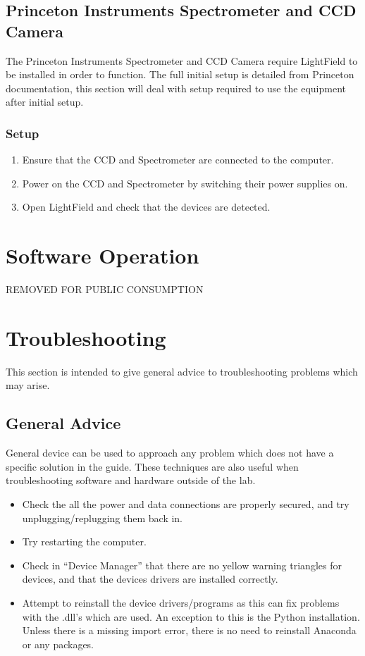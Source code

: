 \documentclass[11pt, letterpaper, titlepage]{article}
\begin{document}
\subsection{Princeton Instruments Spectrometer and CCD Camera} %
The Princeton Instruments Spectrometer and CCD Camera require LightField to be installed in order to function.
The full initial setup is detailed from Princeton documentation, this section will deal with setup required to use the equipment after initial setup.
\subsubsection{Setup} %
\begin{enumerate}
    \item Ensure that the CCD and Spectrometer are connected to the computer.
    \item Power on the CCD and Spectrometer by switching their power supplies on.
    \item Open LightField and check that the devices are detected.
\end{enumerate}
\newpage
\section{Software Operation} %
REMOVED FOR PUBLIC CONSUMPTION
\newpage
\section{Troubleshooting} %
This section is intended to give general advice to troubleshooting problems which may arise.
\subsection{General Advice} %
General device can be used to approach any problem which does not have a specific solution in the guide.
These techniques are also useful when troubleshooting software and hardware outside of the lab.
\begin{itemize}
    \item Check the all the power and data connections are properly secured, and try unplugging/replugging them back in.
    \item Try restarting the computer.
    \item Check in ``Device Manager'' that there are no yellow warning triangles for devices, and that the devices drivers are installed correctly.
    \item Attempt to reinstall the device drivers/programs as this can fix problems with the .dll's which are used.
        \subitem An exception to this is the Python installation.
        Unless there is a missing import error, there is no need to reinstall Anaconda or any packages.
\end{itemize}
\end{document}
